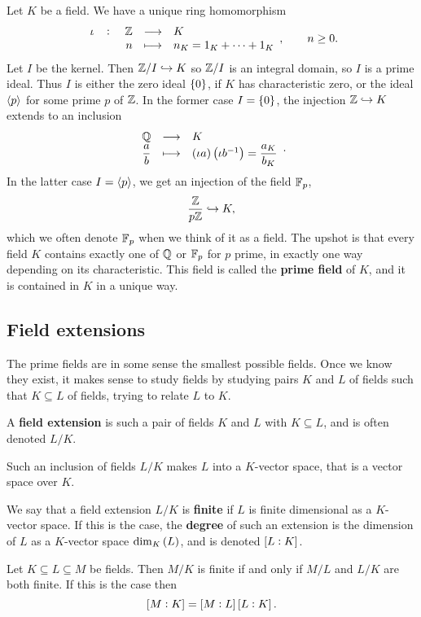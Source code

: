 Let $ K $ be a field. We have a unique ring homomorphism
$$ \function[\iota]{\Z}{K}{n}{n_K = 1_K + \dots + 1_K}, \qquad n \ge 0. $$
Let $ I $ be the kernel. Then $ \mathbb{Z} / I \hookrightarrow K $ so $ \mathbb{Z} / I $ is an integral domain, so $ I $ is a prime ideal. Thus $ I $ is either the zero ideal $ \cbr{0} $, if $ K $ has characteristic zero, or the ideal $ \left\langle p \right\rangle $ for some prime $ p $ of $ \mathbb{Z} $. In the former case $ I = \cbr{0} $, the injection $ \mathbb{Z} \hookrightarrow K $ extends to an inclusion
$$ \function{\Q}{K}{\dfrac{a}{b}}{\br{\iota a}\br{\iota b^{-1}} = \dfrac{a_K}{b_K}}. $$
In the latter case $ I = \left\langle p \right\rangle $, we get an injection of the field $ \mathbb{F}_p $,
$$ \dfrac{\mathbb{Z}}{p\mathbb{Z}} \hookrightarrow K, $$
which we often denote $ \mathbb{F}_p $ when we think of it as a field. The upshot is that every field $ K $ contains exactly one of $ \mathbb{Q} $ or $ \mathbb{F}_p $ for $ p $ prime, in exactly one way depending on its characteristic. This field is called the \textbf{prime field} of $ K $, and it is contained in $ K $ in a unique way.

\subsection{Field extensions}

The prime fields are in some sense the smallest possible fields. Once we know they exist, it makes sense to study fields by studying pairs $ K $ and $ L $ of fields such that $ K \subseteq L $ of fields, trying to relate $ L $ to $ K $.

\begin{definition}
A \textbf{field extension} is such a pair of fields $ K $ and $ L $ with $ K \subseteq L $, and is often denoted $ L / K $.
\end{definition}

\begin{note*}
Such an inclusion of fields $ L / K $ makes $ L $ into a $ K $-vector space, that is a vector space over $ K $.
\end{note*}

\begin{definition}
We say that a field extension $ L / K $ is \textbf{finite} if $ L $ is finite dimensional as a $ K $-vector space. If this is the case, the \textbf{degree} of such an extension is the dimension of $ L $ as a $ K $-vector space $ \dim_K\br{L} $, and is denoted $ \sbr{L : K} $.
\end{definition}

\begin{proposition}
Let $ K \subseteq L \subseteq M $ be fields. Then $ M / K $ is finite if and only if $ M / L $ and $ L / K $ are both finite. If this is the case then
$$ \sbr{M : K} = \sbr{M : L}\sbr{L : K}. $$
\end{proposition}

